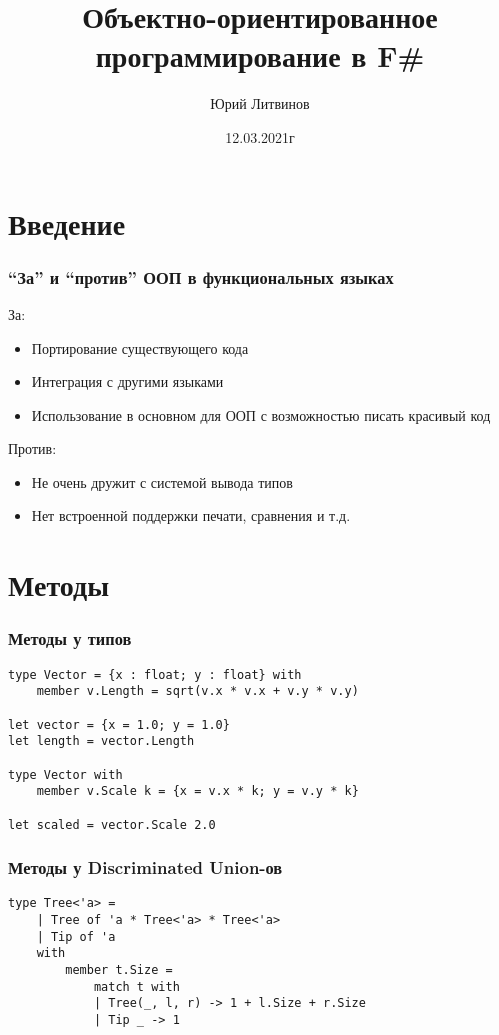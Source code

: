 \documentclass[xetex,mathserif,serif]{beamer}
\title{Объектно-ориентированное программирование в F\#}
\author{Юрий Литвинов}
\date{12.03.2021г}
\begin{document}
    
    \frame{\titlepage}
    
    \section{Введение}

    \begin{frame}
        \frametitle{``За'' и ``против'' ООП в функциональных языках}
        За:
        \begin{itemize}
            \item Портирование существующего кода
            \item Интеграция с другими языками
            \item Использование в основном для ООП с возможностью писать красивый код
        \end{itemize}
        
        Против:
        \begin{itemize}
            \item Не очень дружит с системой вывода типов
            \item Нет встроенной поддержки печати, сравнения и т.д.
        \end{itemize}
    \end{frame}
    
    \section{Методы}
    
    \begin{frame}[fragile]
        \frametitle{Методы у типов}
        \begin{verbatim}
type Vector = {x : float; y : float} with
    member v.Length = sqrt(v.x * v.x + v.y * v.y)

let vector = {x = 1.0; y = 1.0}
let length = vector.Length

type Vector with
    member v.Scale k = {x = v.x * k; y = v.y * k}

let scaled = vector.Scale 2.0
        \end{verbatim}
    \end{frame}

    \begin{frame}[fragile]
        \frametitle{Методы у Discriminated Union-ов}
        \begin{verbatim}
type Tree<'a> =
    | Tree of 'a * Tree<'a> * Tree<'a>
    | Tip of 'a
    with
        member t.Size = 
            match t with
            | Tree(_, l, r) -> 1 + l.Size + r.Size
            | Tip _ -> 1
        \end{verbatim}
    \end{frame}
\end{document}
